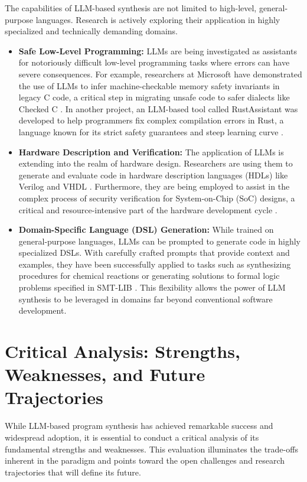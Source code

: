 \documentclass[12pt, a4paper]{report}
\begin{document}
The capabilities of LLM-based synthesis are not limited to high-level, general-purpose languages. Research is actively exploring their application in highly specialized and technically demanding domains.
\begin{itemize}
    \item \textbf{Safe Low-Level Programming:} LLMs are being investigated as assistants for notoriously difficult low-level programming tasks where errors can have severe consequences. For example, researchers at Microsoft have demonstrated the use of LLMs to infer machine-checkable memory safety invariants in legacy C code, a critical step in migrating unsafe code to safer dialects like Checked C \citep{shi2023don}. In another project, an LLM-based tool called RustAssistant was developed to help programmers fix complex compilation errors in Rust, a language known for its strict safety guarantees and steep learning curve \citep{pan2023rustassistant}.
    \item \textbf{Hardware Description and Verification:} The application of LLMs is extending into the realm of hardware design. Researchers are using them to generate and evaluate code in hardware description languages (HDLs) like Verilog and VHDL \citep{luo2023wizardcoder}. Furthermore, they are being employed to assist in the complex process of security verification for System-on-Chip (SoC) designs, a critical and resource-intensive part of the hardware development cycle \citep{thakur2024chip}.
    \item \textbf{Domain-Specific Language (DSL) Generation:} While trained on general-purpose languages, LLMs can be prompted to generate code in highly specialized DSLs. With carefully crafted prompts that provide context and examples, they have been successfully applied to tasks such as synthesizing procedures for chemical reactions or generating solutions to formal logic problems specified in SMT-LIB \citep{dibia2023beyond}. This flexibility allows the power of LLM synthesis to be leveraged in domains far beyond conventional software development.
\end{itemize}

\section{Critical Analysis: Strengths, Weaknesses, and Future Trajectories}

While LLM-based program synthesis has achieved remarkable success and widespread adoption, it is essential to conduct a critical analysis of its fundamental strengths and weaknesses. This evaluation illuminates the trade-offs inherent in the paradigm and points toward the open challenges and research trajectories that will define its future.
\end{document}
